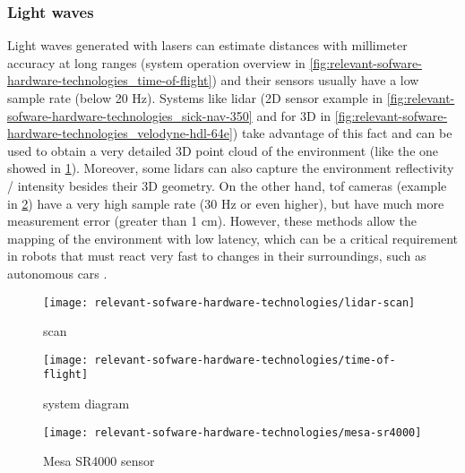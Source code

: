 \subsubsection{Light waves}

Light waves generated with lasers can estimate distances with millimeter accuracy at long ranges (system operation overview in \cref{fig:relevant-sofware-hardware-technologies_time-of-flight}) and their sensors usually have a low sample rate (below 20 Hz). Systems like \gls{lidar} (2D sensor example in \cref{fig:relevant-sofware-hardware-technologies_sick-nav-350} and for 3D in \cref{fig:relevant-sofware-hardware-technologies_velodyne-hdl-64e}) take advantage of this fact and can be used to obtain a very detailed 3D point cloud of the environment (like the one showed in \cref{fig:relevant-sofware-hardware-technologies_lidar-scan}). Moreover, some \glspl{lidar} can also capture the environment reflectivity / intensity besides their 3D geometry. On the other hand, \gls{tof} cameras (example in \cref{fig:relevant-sofware-hardware-technologies_mesa-sr4000}) have a very high sample rate (30 Hz or even higher), but have much more measurement error (greater than 1 cm). However, these methods allow the mapping of the environment with low latency, which can be a critical requirement in robots that must react very fast to changes in their surroundings, such as autonomous cars \cite{Moras2010}.

\begin{figure}[H]
	\centering
	\texttt{[image: relevant-sofware-hardware-technologies/lidar-scan]}
	\caption[ scan]{ scan\protect\footnotemark}
	\label{fig:relevant-sofware-hardware-technologies_lidar-scan}
\end{figure}


\begin{savenotes}
\begin{figure}[H]
	\centering
	\begin{minipage}[h]{.47\textwidth}
		\centering
		\texttt{[image: relevant-sofware-hardware-technologies/time-of-flight]}
		\caption[ system diagram]{ system diagram\protect\footnotemark}
		\label{fig:relevant-sofware-hardware-technologies_time-of-flight}
	\end{minipage}\hfill
{}
	\begin{minipage}[h]{.47\textwidth}
		\centering
		\texttt{[image: relevant-sofware-hardware-technologies/mesa-sr4000]}
		\caption[Mesa SR4000 sensor]{Mesa SR4000 sensor\protect\footnotemark}
		\label{fig:relevant-sofware-hardware-technologies_mesa-sr4000}
	\end{minipage}
\end{figure}
\end{savenotes}


